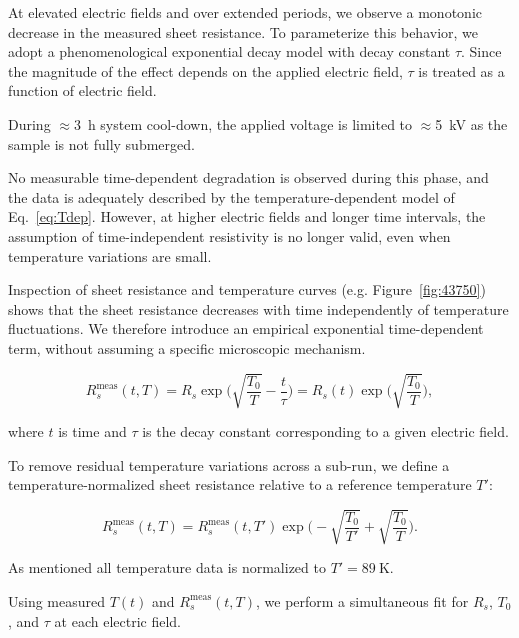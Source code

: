 \documentclass[a4paper,12pt]{article}
\begin{document}
At elevated electric fields and over extended periods, we observe a monotonic decrease in the measured sheet resistance. 
To parameterize this behavior, we adopt a phenomenological exponential decay model with decay constant $\tau$. 
Since the magnitude of the effect depends on the applied electric field, $\tau$ is treated as a function of electric field.

During $\approx$\SI{3}{\hour} system cool-down, the applied voltage is limited to $\approx$\SI{5}{\kilo\volt} as the sample is not fully submerged.

No measurable time-dependent degradation is observed during this phase, and the data is adequately described by the temperature-dependent model of Eq.~\ref{eq:Tdep}. 
However, at higher electric fields and longer time intervals, the assumption of time-independent resistivity is no longer valid, even when temperature variations are small.

Inspection of sheet resistance and temperature curves (e.g. Figure~\ref{fig:43750}) shows that the sheet resistance decreases with time independently of temperature fluctuations. 
We therefore introduce an empirical exponential time-dependent term, without assuming a specific microscopic mechanism.

\begin{equation}
	R_{s}^{\mathrm{meas}}(t,T)
	=
	R_s
	\exp\bigg(
	\sqrt{\frac{T_0}{T}}
	-
	\frac{t}{\tau}
	\bigg)
	=
	R_s(t)\exp\bigg(\sqrt{\frac{T_0}{T}}\bigg),
\end{equation}

where $t$ is time and $\tau$ is the decay constant corresponding to a given electric field.

To remove residual temperature variations across a sub-run, we define a temperature-normalized sheet resistance relative to a reference temperature $T'$:

\begin{equation}
	R_{s}^{\mathrm{meas}}(t,T)
	=
	R_{s}^{\mathrm{meas}}(t,T')
	\exp\bigg(
	-\sqrt{\frac{T_0}{T'}}
	+
	\sqrt{\frac{T_0}{T}}
	\bigg).
\end{equation}

As mentioned all temperature data is normalized to $T' = \SI{89}{\kelvin}$.


Using measured $T(t)$ and $R_{s}^{\mathrm{meas}}(t,T)$, we perform a simultaneous fit for $R_s$, $T_0$, and $\tau$ at each electric field.
\end{document}
